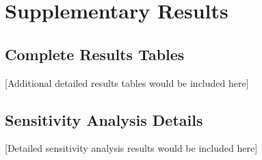 \documentclass[12pt,a4paper]{report}
\begin{document}
\chapter{Supplementary Results}

\section{Complete Results Tables}

[Additional detailed results tables would be included here]

\section{Sensitivity Analysis Details}

[Detailed sensitivity analysis results would be included here]
\end{document}
